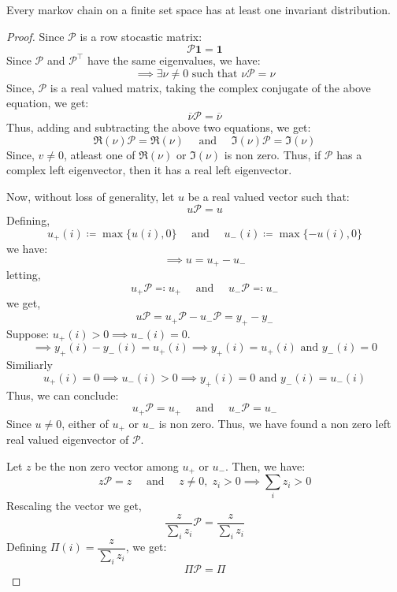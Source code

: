 \begin{theorem}
    Every markov chain on a finite set space has at least one invariant distribution.
\end{theorem}
\begin{proof}
    Since \(\mathcal{P} \) is a row stocastic matrix:
    \[
        \mathcal{P} \mathbf{1} = \mathbf{1}  
    \]
    Since \(\mathcal{P} \) and \(\mathcal{P} ^{\top} \) have the same eigenvalues, we have:
    \[
        \implies \exists \nu  \neq 0 \text{ such that }  \nu \mathcal{P} = \nu
    \]
    Since, \(\mathcal{P}\) is a real valued matrix, taking the complex conjugate of the above equation, we get:
    \[
        \overline{\nu} \mathcal{P} = \overline{\nu}
    \]
    Thus, adding and subtracting the above two equations, we get:
    \[
        \Re (\nu) \mathcal{P} = \Re (\nu) \quad \text{ and } \quad  \Im (\nu) \mathcal{P} = \Im (\nu)
    \]
    Since, \(v \neq  0\), atleast one of \(\Re (\nu) \) or \(\Im (\nu) \) is non zero.
    Thus, if \(\mathcal{P} \) has a complex left eigenvector, then it has a real left eigenvector.

    Now, without loss of generality, let \(u\) be a real valued vector such that:
    \[
        u \mathcal{P} = u
    \]
    Defining,
    \[
        u_+(i) \coloneqq  \max \{u(i), 0\} \quad \text{ and } \quad u_-(i) \coloneqq  \max \{-u(i), 0\}
    \]
    we have:
    \[
        \implies u = u_+ - u_-
    \]
    letting,
    \[
        u_+ \mathcal{P} \eqqcolon u_+ \quad \text{ and } \quad u_- \mathcal{P} \eqqcolon  u_-
    \]
    we get,
    \[
        u \mathcal{P} = u_+ \mathcal{P} - u_- \mathcal{P} = y_+ - y_-  
    \]
    Suppose: \( u_+(i) > 0  \implies  u_-(i) = 0\).
    \[
        \implies y_+(i) - y_-(i) = u_+(i) \implies y_+(i) = u_+(i) \text{ and } y_-(i) = 0 
    \]
    Similiarly
    \[
        u_+(i) = 0 \implies u_-(i) > 0 \implies y_+(i) = 0 \text{ and } y_-(i) = u_-(i)
    \]
    Thus, we can conclude:
    \[
        u_+ \mathcal{P} = u_+ \quad \text{ and } \quad u_- \mathcal{P} = u_-
    \]
    Since \(u \neq  0\), either of \(u_+\) or \(u_-\) is non zero. 
    Thus, we have found a non zero left real valued eigenvector of \(\mathcal{P}\).

    Let \(z\) be the non zero vector among  \(u_+\) or \(u_-\). Then, we have:
    \[
        z \mathcal{P} = z \quad \text{ and } \quad z \neq 0, \; z_i > 0 \implies \sum_{i} z_i > 0 
    \]
    Rescaling the vector we get,
    \[
        \frac{z}{\sum_i z_i} \mathcal{P} = \frac{z}{\sum_i z_i}
    \]
    Defining \(\Pi(i) = \dfrac{z}{\sum_i z_i}\), we get:
    \[
        \Pi \mathcal{P} = \Pi
    \]    
\end{proof}